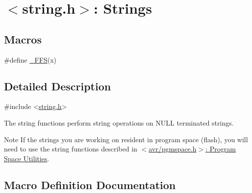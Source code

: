 \hypertarget{group__avr__string}{}\section{$<$string.\+h$>$\+: Strings}
\label{group__avr__string}
\subsection*{Macros}
\begin{DoxyCompactItemize}
\item 
\#define \hyperlink{group__avr__string_gaedb0e7bb7333d6122472acddb5df20ac}{\+\_\+\+F\+FS}(x)
\end{DoxyCompactItemize}


\subsection{Detailed Description}

\begin{DoxyCode}
\textcolor{preprocessor}{#include <\hyperlink{string_8h}{string.h}>} 
\end{DoxyCode}


The string functions perform string operations on N\+U\+LL terminated strings.

\begin{DoxyNote}{Note}
If the strings you are working on resident in program space (flash), you will need to use the string functions described in \hyperlink{group__avr__pgmspace}{$<$avr/pgmspace.\+h$>$\+: Program Space Utilities}. 
\end{DoxyNote}


\subsection{Macro Definition Documentation}
